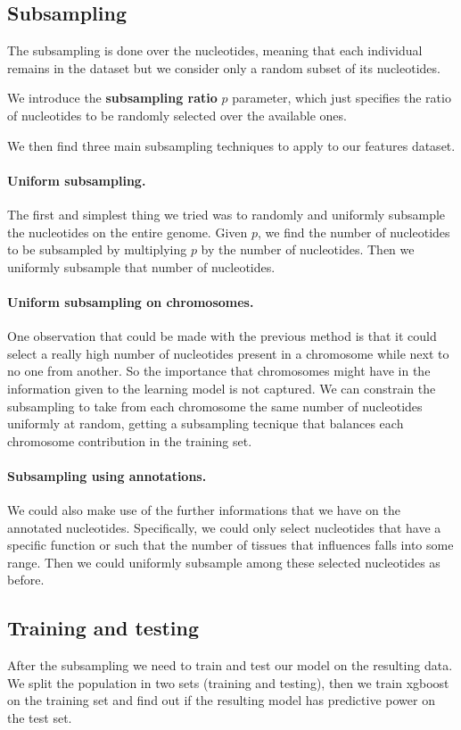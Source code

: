 \subsection{Subsampling}

The subsampling is done over the nucleotides, meaning that each individual remains in the dataset but we consider only a random subset of its nucleotides.

We introduce the \textbf{subsampling ratio} $p$ parameter, which just specifies the ratio of nucleotides to be randomly selected over the available ones.

We then find three main subsampling techniques to apply to our features dataset.

\paragraph{Uniform subsampling.}
The first and simplest thing we tried was to randomly and uniformly subsample the nucleotides on the entire genome.
Given $p$, we find the number of nucleotides to be subsampled by multiplying $p$ by the number of nucleotides.
Then we uniformly subsample that number of nucleotides.

\paragraph{Uniform subsampling on chromosomes.}
One observation that could be made with the previous method is that it could select a really high number of nucleotides present in a chromosome while next to no one from another. 
So the importance that chromosomes might have in the information given to the learning model is not captured. 
We can constrain the subsampling to take from each chromosome the same number of nucleotides uniformly at random, getting a subsampling tecnique that balances each chromosome contribution in the training set.

\paragraph{Subsampling using annotations.}
We could also make use of the further informations that we have on the annotated nucleotides.
Specifically, we could only select nucleotides that have a specific function or such that the number of tissues that influences falls into some range.
Then we could uniformly subsample among these selected nucleotides as before.


\subsection{Training and testing}

After the subsampling we need to train and test our model on the resulting data. 
We split the population in two sets (training and testing), then we train xgboost on the training set and find out if the resulting model has predictive power on the test set.